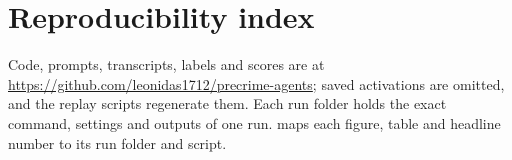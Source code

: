 \section{Reproducibility index}
\label{app:repro}

Code, prompts, transcripts, labels and scores are at \url{https://github.com/leonidas1712/precrime-agents}; saved activations are omitted, and the replay scripts regenerate them.
Each run folder holds the exact command, settings and outputs of one run.
 maps each figure, table and headline number to its run folder and script.

\begin{table}[h]
  \centering
  \scriptsize
  
  \caption{Reproducibility index.}
  \label{tab:repro}
\end{table}
